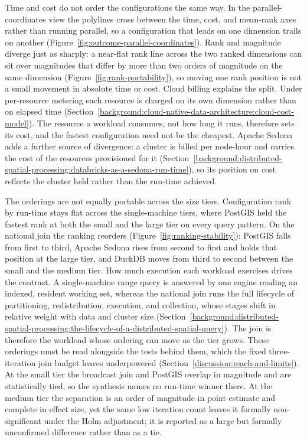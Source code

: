 Time and cost do not order the configurations the same way. In the parallel-coordinates view the polylines cross between the time, cost, and mean-rank axes rather than running parallel, so a configuration that leads on one dimension trails on another (Figure~\ref{fig:outcome-parallel-coordinates}). Rank and magnitude diverge just as sharply: a near-flat rank line across the two ranked dimensions can sit over magnitudes that differ by more than two orders of magnitude on the same dimension (Figure~\ref{fig:rank-portability}), so moving one rank position is not a small movement in absolute time or cost. Cloud billing explains the split. Under per-resource metering each resource is charged on its own dimension rather than on elapsed time \parencite{mell2011_nist_definition_of_cloud_computing} (Section~\ref{background:cloud-native-data-architecture:cloud-cost-model}). The resource a workload consumes, not how long it runs, therefore sets its cost, and the fastest configuration need not be the cheapest. Apache Sedona adds a further source of divergence: a cluster is billed per node-hour and carries the cost of the resources provisioned for it \parencite{databricks2024_cost_optimization_best_practices} (Section~\ref{background:distributed-spatial-processing:databricks-as-a-sedona-run-time}), so its position on cost reflects the cluster held rather than the run-time achieved.

The orderings are not equally portable across the size tiers. Configuration rank by run-time stays flat across the single-machine tiers, where PostGIS held the fastest rank at both the small and the large tier on every query pattern. On the national join the ranking reorders (Figure~\ref{fig:ranking-stability}): PostGIS falls from first to third, Apache Sedona rises from second to first and holds that position at the large tier, and DuckDB moves from third to second between the small and the medium tier. How much execution each workload exercises drives the contrast. A single-machine range query is answered by one engine reading an indexed, resident working set, whereas the national join runs the full lifecycle of partitioning, redistribution, execution, and collection, whose stages shift in relative weight with data and cluster size \parencite{yu2019_geospark_perspective_beyond} (Section~\ref{background:distributed-spatial-processing:the-lifecycle-of-a-distributed-spatial-query}). The join is therefore the workload whose ordering can move as the tier grows. These orderings must be read alongside the tests behind them, which the fixed three-iteration join budget leaves underpowered (Section~\ref{discussion:reach-and-limits}). At the small tier the broadcast join and PostGIS overlap in magnitude and are statistically tied, so the synthesis names no run-time winner there. At the medium tier the separation is an order of magnitude in point estimate and complete in effect size, yet the same low iteration count leaves it formally non-significant under the Holm adjustment; it is reported as a large but formally unconfirmed difference rather than as a tie.


